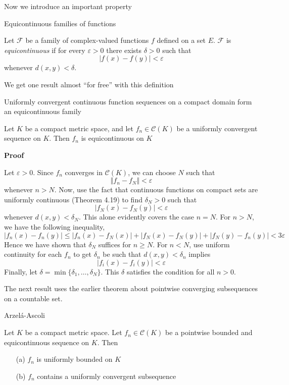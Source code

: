 Now we introduce an important property 

\begin{definition} Equicontinuous families of functions

    Let $\mathscr{F}$ be a family of complex-valued functions $f$ defined on a set $E$. $\mathscr{F}$ is \textit{equicontinuous} if for every $\varepsilon > 0$ there exists $\delta > 0$ such that
    \[|f(x) - f(y)| < \varepsilon\]
    whenever $d(x, y) < \delta$.
\end{definition}

We get one result almost ``for free'' with this definition

\begin{theorem} Uniformly convergent continuous function sequences on a compact domain form an equicontinuous family

    Let $K$ be a compact metric space, and let $f_n \in \mathscr{C}(K)$ be a uniformly convergent sequence on $K$. Then $f_n$ is equicontinuous on $K$

    \textbf{Proof}

    Let $\varepsilon > 0$. Since $f_n$ converges in $\mathscr{C}(K)$, we can choose $N$ such that
    \[\Vert f_n - f_N \Vert < \varepsilon\]
    whenever $n > N$. Now, use the fact that continuous functions on compact sets are uniformly continuous (Theorem 4.19) to find $\delta_N > 0$ such that 
    \[|f_N(x) - f_N(y)| < \varepsilon\]
    whenever $d(x, y) < \delta_N$. This alone evidently covers the case $n = N$. For $n > N$, we have the following inequality,
    \[|f_n(x) - f_n(y)| \leq |f_n(x) - f_N(x)| + |f_N(x) - f_N(y)| + |f_N(y) - f_n(y)| < 3\varepsilon\]
    Hence we have shown that $\delta_N$ suffices for $n \geq N$. For $n < N$, use uniform continuity for each $f_n$ to get $\delta_n$ be such that $d(x, y) < \delta_n$ implies
    \[|f_i(x) - f_i(y)| < \varepsilon\]
    Finally, let $\delta = \min \{\delta_1, \ldots, \delta_N\}$. This $\delta$ satisfies the condition for all $n > 0$.
\end{theorem}

The next result uses the earlier theorem about pointwise converging subsequences on a countable set.

\begin{theorem} Arzel\'a-Ascoli

    Let $K$ be a compact metric space. Let $f_n \in \mathscr{C}(K)$ be a pointwise bounded and equicontinuous sequence on $K$. Then
    \begin{itemize}
        \item[(a)] $f_n$ is uniformly bounded on $K$
        \item[(b)] $f_n$ contains a uniformly convergent subsequence
    \end{itemize}

\end{theorem}


